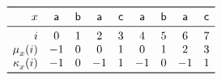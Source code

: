 \documentclass{article}
\begin{document}
\TeXtoEPS
\(
\begin{array}{rccccccccc}
\toprule
  x 
& \word{a} & \word{b} & \word{a} & \word{c} 
& \word{a} & \word{b} & \word{a} & \word{c}\\
\midrule
  i
& 0 & 1 & 2 & 3 & 4 & 5 & 6 & 7\\
  \MPfailure{x}{}{i}
& -1 & 0 & 0 & 1 & 0 & 1 & 2 & 3\\
  \KMPfailure{x}{}{i}
& -1 & 0 & -1 & 1 & -1 & 0 & -1 & 1\\
\bottomrule
\end{array}
\)
\endTeXtoEPS
\end{document}
